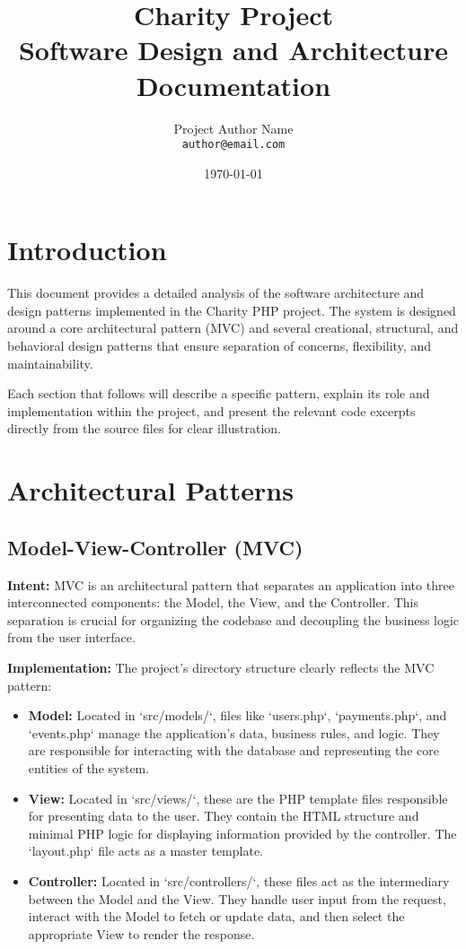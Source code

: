 \documentclass[11pt,a4paper]{article}
\title{
  \vspace{2cm} %
  \Huge Charity Project \\
  \vspace{0.5cm}
  \Large Software Design and Architecture Documentation
  \vspace{2cm}
}
\author{
  Project Author Name \\ %
  \texttt{author@email.com} %
}
\date{\today}
\begin{document}
\maketitle
\thispagestyle{empty} %

\newpage

\tableofcontents

\newpage

\section{Introduction}
This document provides a detailed analysis of the software architecture and design patterns implemented in the Charity PHP project. The system is designed around a core architectural pattern (MVC) and several creational, structural, and behavioral design patterns that ensure separation of concerns, flexibility, and maintainability.

Each section that follows will describe a specific pattern, explain its role and implementation within the project, and present the relevant code excerpts directly from the source files for clear illustration.

\section{Architectural Patterns}

\subsection{Model-View-Controller (MVC)}
\textbf{Intent:} MVC is an architectural pattern that separates an application into three interconnected components: the Model, the View, and the Controller. This separation is crucial for organizing the codebase and decoupling the business logic from the user interface.

\textbf{Implementation:} The project's directory structure clearly reflects the MVC pattern:
\begin{itemize}
    \item \textbf{Model:} Located in `src/models/`, files like `users.php`, `payments.php`, and `events.php` manage the application's data, business rules, and logic. They are responsible for interacting with the database and representing the core entities of the system.
    \item \textbf{View:} Located in `src/views/`, these are the PHP template files responsible for presenting data to the user. They contain the HTML structure and minimal PHP logic for displaying information provided by the controller. The `layout.php` file acts as a master template.
    \item \textbf{Controller:} Located in `src/controllers/`, these files act as the intermediary between the Model and the View. They handle user input from the request, interact with the Model to fetch or update data, and then select the appropriate View to render the response.
\end{itemize}
\end{document}
